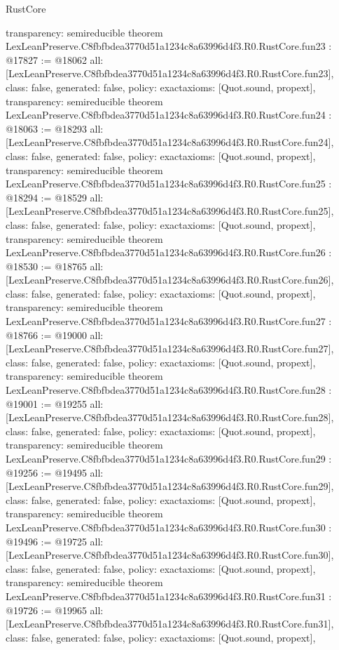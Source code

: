 \begin{lexlean}{RustCore}
\begin{coremodule}
{  transparency: semireducible
}
theorem LexLeanPreserve.C8fbfbdea3770d51a1234c8a63996d4f3.R0.RustCore.fun23 : @17827 := @18062 {
  all: [LexLeanPreserve.C8fbfbdea3770d51a1234c8a63996d4f3.R0.RustCore.fun23],
  class: false,
  generated: false,
  policy: exact{axioms: [Quot.sound, propext]},
  transparency: semireducible
}
theorem LexLeanPreserve.C8fbfbdea3770d51a1234c8a63996d4f3.R0.RustCore.fun24 : @18063 := @18293 {
  all: [LexLeanPreserve.C8fbfbdea3770d51a1234c8a63996d4f3.R0.RustCore.fun24],
  class: false,
  generated: false,
  policy: exact{axioms: [Quot.sound, propext]},
  transparency: semireducible
}
theorem LexLeanPreserve.C8fbfbdea3770d51a1234c8a63996d4f3.R0.RustCore.fun25 : @18294 := @18529 {
  all: [LexLeanPreserve.C8fbfbdea3770d51a1234c8a63996d4f3.R0.RustCore.fun25],
  class: false,
  generated: false,
  policy: exact{axioms: [Quot.sound, propext]},
  transparency: semireducible
}
theorem LexLeanPreserve.C8fbfbdea3770d51a1234c8a63996d4f3.R0.RustCore.fun26 : @18530 := @18765 {
  all: [LexLeanPreserve.C8fbfbdea3770d51a1234c8a63996d4f3.R0.RustCore.fun26],
  class: false,
  generated: false,
  policy: exact{axioms: [Quot.sound, propext]},
  transparency: semireducible
}
theorem LexLeanPreserve.C8fbfbdea3770d51a1234c8a63996d4f3.R0.RustCore.fun27 : @18766 := @19000 {
  all: [LexLeanPreserve.C8fbfbdea3770d51a1234c8a63996d4f3.R0.RustCore.fun27],
  class: false,
  generated: false,
  policy: exact{axioms: [Quot.sound, propext]},
  transparency: semireducible
}
theorem LexLeanPreserve.C8fbfbdea3770d51a1234c8a63996d4f3.R0.RustCore.fun28 : @19001 := @19255 {
  all: [LexLeanPreserve.C8fbfbdea3770d51a1234c8a63996d4f3.R0.RustCore.fun28],
  class: false,
  generated: false,
  policy: exact{axioms: [Quot.sound, propext]},
  transparency: semireducible
}
theorem LexLeanPreserve.C8fbfbdea3770d51a1234c8a63996d4f3.R0.RustCore.fun29 : @19256 := @19495 {
  all: [LexLeanPreserve.C8fbfbdea3770d51a1234c8a63996d4f3.R0.RustCore.fun29],
  class: false,
  generated: false,
  policy: exact{axioms: [Quot.sound, propext]},
  transparency: semireducible
}
theorem LexLeanPreserve.C8fbfbdea3770d51a1234c8a63996d4f3.R0.RustCore.fun30 : @19496 := @19725 {
  all: [LexLeanPreserve.C8fbfbdea3770d51a1234c8a63996d4f3.R0.RustCore.fun30],
  class: false,
  generated: false,
  policy: exact{axioms: [Quot.sound, propext]},
  transparency: semireducible
}
theorem LexLeanPreserve.C8fbfbdea3770d51a1234c8a63996d4f3.R0.RustCore.fun31 : @19726 := @19965 {
  all: [LexLeanPreserve.C8fbfbdea3770d51a1234c8a63996d4f3.R0.RustCore.fun31],
  class: false,
  generated: false,
  policy: exact{axioms: [Quot.sound, propext]},
}
\end{coremodule}
\end{lexlean}
